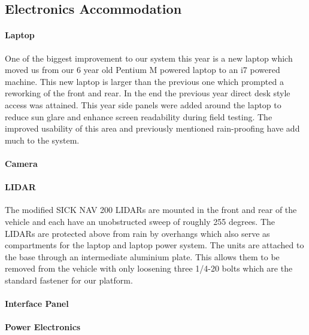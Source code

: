 \subsection{Electronics Accommodation}
\paragraph{Laptop}
One of the biggest improvement to our system this year is a new laptop which moved us from our 6 year old Pentium M powered laptop to an i7 powered machine. This new laptop is larger than the previous one which prompted a reworking of the front and rear. In the end the previous year direct desk style access was attained. This year side panels were added around the laptop to reduce sun glare and enhance screen readability during field testing. The improved usability of this area and previously mentioned rain-proofing have add much to the system.

\paragraph{Camera}

\paragraph{LIDAR}
The modified SICK NAV 200 LIDARs are mounted in the front and rear of the vehicle and each have an unobstructed sweep of roughly 255 degrees. The LIDARs are protected above from rain by overhangs which also serve as compartments for the laptop and laptop power system. The units are attached to the base through an intermediate aluminium plate. This allows them to be removed from the vehicle with only loosening three 1/4-20 bolts which are the standard fastener for our platform.

\paragraph{Interface Panel}

\paragraph{Power Electronics}
